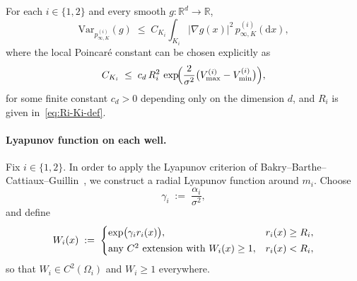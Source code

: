 \begin{lemma}\label{lem:local-Poincare-Ki}
For each \(i\in\{1,2\}\) and every smooth \(g:\mathbb R^d\to\mathbb R\),
\begin{equation}\label{eq:Ki-Poincare}
\mathrm{Var}_{p_{\infty,K}^{(i)}}(g)
\;\le\;
C_{K_i}\int_{K_i}|\nabla g(x)|^2\,p_{\infty,K}^{(i)}(\mathrm dx),
\end{equation}
where the local Poincar\'e constant can be chosen explicitly as
\begin{equation}\label{eq:CKi-explicit}
C_{K_i}
\;\le\;
c_d\,R_i^2\,
\exp\!\Bigl(\frac{2}{\sigma^2}\bigl(V_{\max}^{(i)}-V_{\min}^{(i)}\bigr)\Bigr),
\end{equation}
for some finite constant \(c_d>0\) depending only on the dimension \(d\),
and \(R_i\) is given in~\eqref{eq:Ri-Ki-def}.
\end{lemma}

\paragraph{Lyapunov function on each well.}
Fix \(i\in\{1,2\}\).
In order to apply the Lyapunov criterion of
Bakry--Barthe--Cattiaux--Guillin~\cite{bakry2008simple}, we construct a
radial Lyapunov function around \(m_i\).
Choose
\begin{equation}\label{eq:gamma-i-def}
\gamma_i
\;:=\;
\frac{\alpha_i}{\sigma^2},
\end{equation}
and define
\begin{equation}\label{eq:Wi-def}
W_i(x)
\;:=\;
\begin{cases}
\exp\bigl(\gamma_i r_i(x)\bigr), & r_i(x)\ge R_i,\vspace{2pt}\\
\text{any $C^2$ extension with }W_i(x)\ge 1, & r_i(x)<R_i,
\end{cases}
\end{equation}
so that \(W_i\in C^2(\Omega_i)\) and \(W_i\ge 1\) everywhere.

